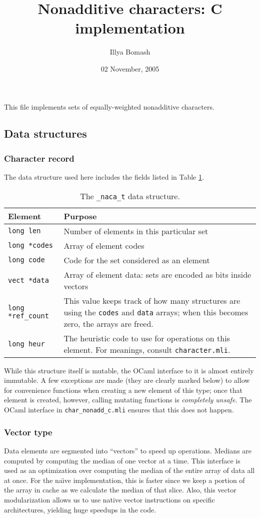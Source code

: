 \documentclass{article}
\author{Illya Bomash}
\date{02 November, 2005}
\title{Nonadditive characters: C implementation}
\begin{document}
\maketitle

This file implements sets of equally-weighted nonadditive characters.

\subsection*{Data structures}

\subsubsection*{Character record}
The data structure used here includes the fields listed in Table
\ref{tab:nacat}.
\begin{table}
  \centering
  \begin{tabular}{lp{250pt}}
    \hline
    Element & Purpose \\
    \hline
    \texttt{long len} & Number of elements in this particular set \\
    \texttt{long *codes} & Array of element codes \\
    \texttt{long code} & Code for the set considered as an element \\
    \texttt{vect *data} & Array of element data: sets are encoded as bits inside
    vectors \\
    \texttt{long *ref\_count} & This value keeps track of how many structures are
    using the \texttt{codes} and \texttt{data} arrays;  when this becomes zero,
    the arrays are freed. \\
    \texttt{long heur} & The heuristic code to use for operations on this
    element.  For meanings, consult \texttt{character.mli}. \\
    \hline
  \end{tabular}
\caption{\label{tab:nacat}The \texttt{\_naca\_t} data structure.}
\end{table}
While this structure itself is mutable, the OCaml interface to it is almost
entirely immutable.  A few exceptions are made (they are clearly marked below)
to allow for convenience functions when creating a new element of this type;
once that element is created, however, calling mutating functions is
\textit{completely unsafe.}  The OCaml interface in \texttt{char\_nonadd\_c.mli}
ensures that this does not happen.

\subsubsection*{Vector type}
Data elements are segmented into ``vectors'' to speed up operations.  Medians
are computed by computing the median of one vector at a time.  This interface is
used as an optimization over computing the median of the entire array of data
all at once.  For the na\"\i ve implementation, this is faster since we keep a
portion of the array in cache as we calculate the median of that slice.  Also,
this vector modularization allows us to use native vector instructions on
specific architectures, yielding huge speedups in the code.
\end{document}
